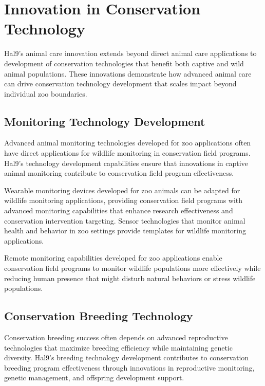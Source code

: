 \documentclass[
  Letterpaper,
]{scrbook}
\begin{document}
\section{Innovation in Conservation
Technology}\label{innovation-in-conservation-technology}

Hal9's animal care innovation extends beyond direct animal care
applications to development of conservation technologies that benefit
both captive and wild animal populations. These innovations demonstrate
how advanced animal care can drive conservation technology development
that scales impact beyond individual zoo boundaries.

\subsection{Monitoring Technology
Development}\label{monitoring-technology-development}

Advanced animal monitoring technologies developed for zoo applications
often have direct applications for wildlife monitoring in conservation
field programs. Hal9's technology development capabilities ensure that
innovations in captive animal monitoring contribute to conservation
field program effectiveness.

Wearable monitoring devices developed for zoo animals can be adapted for
wildlife monitoring applications, providing conservation field programs
with advanced monitoring capabilities that enhance research
effectiveness and conservation intervention targeting. Sensor
technologies that monitor animal health and behavior in zoo settings
provide templates for wildlife monitoring applications.

Remote monitoring capabilities developed for zoo applications enable
conservation field programs to monitor wildlife populations more
effectively while reducing human presence that might disturb natural
behaviors or stress wildlife populations.

\subsection{Conservation Breeding
Technology}\label{conservation-breeding-technology}

Conservation breeding success often depends on advanced reproductive
technologies that maximize breeding efficiency while maintaining genetic
diversity. Hal9's breeding technology development contributes to
conservation breeding program effectiveness through innovations in
reproductive monitoring, genetic management, and offspring development
support.
\end{document}
